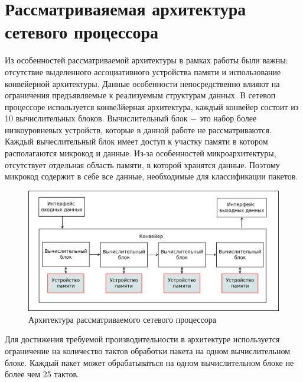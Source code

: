 \documentclass[a4peper, 12pt, titlepage, finall]{report}
\begin{document}
    \chapter{Рассматриваяемая архитектура сетевого процессора}
        Из особенностей рассматриваемой архитектуры в рамках работы были важны: отсутствие выделенного ассоциативного устройства памяти и использование конвейерной архитектуры. 
        Данные особенности непосредственно влияют на ограничения предъявляемые к реализуемым структурам данных. В сетевоп процессоре используется конве3йерная 
        архитектура, каждый конвейер состоит из 10 вычислительных блоков. Вычислительный блок $-$ это набор более низкоуровневых устройств,
        которые в данной работе не рассматриваются. Каждый вычеслительный блок имеет доступ к участку памяти в котором располагаются микрокод и данные.
        Из-за особенностей микроархитектуры, отсутствует отдельная область памяти, в которой хранятся данные. Поэтому микрокод содержит в себе все данные,
        необходимые для классификации пакетов.
        \begin{figure}[h]
            \includegraphics[width=\textwidth]{npu_all.png}
            \caption{Архитектура рассматриваемого сетевого процессора}
        \end{figure}
        Для достижения требуемой производительности в архитектуре используется ограничение на количество тактов обработки пакета
        на одном вычислительном блоке. Каждый пакет может обрабатываться на одном вычислительном блоке не более чем 25 тактов.
        
\end{document}
